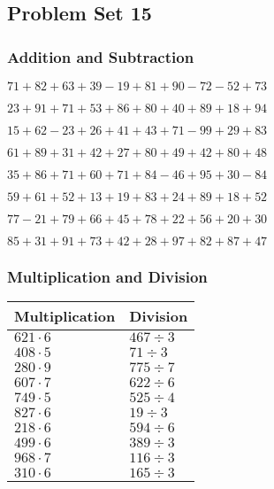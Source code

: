 \hypertarget{problem-set-15}{%
\subsection{Problem Set 15}\label{problem-set-15}}

\hypertarget{addition-and-subtraction}{%
\subsubsection{Addition and
Subtraction}\label{addition-and-subtraction}}

\(71+82+63+39-19+81+90-72-52+73\)

\(23+91+71+53+86+80+40+89+18+94\)

\(15+62-23+26+41+43+71-99+29+83\)

\(61+89+31+42+27+80+49+42+80+48\)

\(35+86+71+60+71+84-46+95+30-84\)

\(59+61+52+13+19+83+24+89+18+52\)

\(77-21+79+66+45+78+22+56+20+30\)

\(85+31+91+73+42+28+97+82+87+47\)

\hypertarget{multiplication-and-division}{%
\subsubsection{Multiplication and
Division}\label{multiplication-and-division}}

\begin{longtable}[]{@{}ll@{}}
\toprule
Multiplication & Division\tabularnewline
\midrule
\endhead
\(621\cdot6\) & \(467÷3\)\tabularnewline
\(408\cdot5\) & \(71÷3\)\tabularnewline
\(280\cdot9\) & \(775÷7\)\tabularnewline
\(607\cdot7\) & \(622÷6\)\tabularnewline
\(749\cdot5\) & \(525÷4\)\tabularnewline
\(827\cdot6\) & \(19÷3\)\tabularnewline
\(218\cdot6\) & \(594÷6\)\tabularnewline
\(499\cdot6\) & \(389÷3\)\tabularnewline
\(968\cdot7\) & \(116÷3\)\tabularnewline
\(310\cdot6\) & \(165÷3\)\tabularnewline
\bottomrule
\end{longtable}
